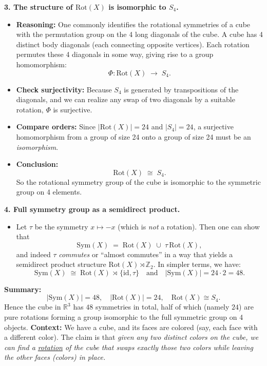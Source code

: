 \documentclass[12pt]{article}
\theoremstyle{definition} %
\theoremstyle{plain} %
\begin{document}
\bigskip

\noindent
\textbf{3. The structure of $\mathrm{Rot}(X)$ is isomorphic to $S_4$.}

\begin{itemize}
    \item \textbf{Reasoning:} 
    One commonly identifies the rotational symmetries of a cube with the permutation group on the 4 long diagonals of the cube.  A cube has 4 distinct body diagonals (each connecting opposite vertices).  Each rotation permutes these 4 diagonals in some way, giving rise to a group homomorphism:
    \[
      \Phi : \mathrm{Rot}(X) \;\longrightarrow\; S_4.
    \]
    \item \textbf{Check surjectivity:}
    Because $S_4$ is generated by transpositions of the diagonals, and we can realize any swap of two diagonals by a suitable rotation, $\Phi$ is surjective.

    \item \textbf{Compare orders:}
    Since $|\mathrm{Rot}(X)| = 24$ and $|S_4| = 24$, a surjective homomorphism from a group of size 24 onto a group of size 24 must be an \emph{isomorphism}.

    \item \textbf{Conclusion:}
    \[
      \mathrm{Rot}(X) \;\cong\; S_4.
    \]
    So the rotational symmetry group of the cube is isomorphic to the symmetric group on 4 elements.

\end{itemize}

\bigskip

\noindent
\textbf{4. Full symmetry group as a semidirect product.}

\begin{itemize}
    \item Let $\tau$ be the symmetry $x \mapsto -x$ (which is \emph{not} a rotation).  Then one can show that 
    \[
      \mathrm{Sym}(X) \;=\; \mathrm{Rot}(X) \;\cup\; \tau\,\mathrm{Rot}(X),
    \]
    and indeed $\tau$ \emph{commutes} or “almost commutes” in a way that yields a semidirect product structure $\mathrm{Rot}(X) \rtimes \mathbb{Z}_2$.  In simpler terms, we have:
    \[
      \mathrm{Sym}(X) \;\cong\; \mathrm{Rot}(X)\,\rtimes\,\{\mathrm{id}, \tau\}
      \quad \text{and} \quad
      |\mathrm{Sym}(X)| = 24 \cdot 2 = 48.
    \]

\end{itemize}

\bigskip

\noindent
\textbf{Summary:}
\[
|\mathrm{Sym}(X)| = 48, 
\quad
|\mathrm{Rot}(X)| = 24,
\quad
\mathrm{Rot}(X) \cong S_4.
\]
Hence the cube in $\mathbb{R}^3$ has $48$ symmetries in total, half of which (namely $24$) are pure rotations forming a group isomorphic to the full symmetric group on 4 objects.
\noindent
\textbf{Context:} 
We have a cube, and its faces are colored (say, each face with a different color). 
The claim is that \emph{given any two distinct colors on the cube, we can find a \underline{rotation} of the cube that swaps exactly those two colors while leaving the other faces (colors) in place.}
\end{document}
